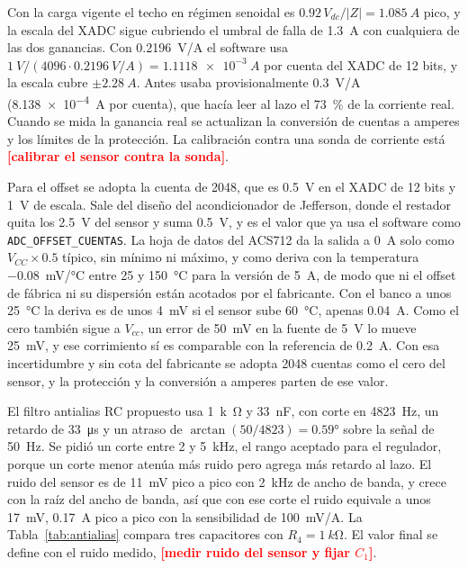 \documentclass[journal]{IEEEtran}
\newcommand{\pendiente}[1]{\textcolor{red}{\textbf{[#1]}}}
\begin{document}
Con la carga vigente el techo en régimen senoidal es $0.92\,V_{dc}/|Z|=\SI{1.085}{A}$ pico, y la escala del XADC sigue cubriendo el umbral de falla de \SI{1.3}{A} con cualquiera de las dos ganancias. Con \SI{0.2196}{V/A} el software usa $\SI{1}{V}/(4096\cdot\SI{0.2196}{V/A})=\SI{1.1118e-3}{A}$ por cuenta del XADC de \num{12} bits, y la escala cubre $\pm\SI{2.28}{A}$. Antes usaba provisionalmente \SI{0.3}{V/A} (\SI{8.138e-4}{A} por cuenta), que hacía leer al lazo el \SI{73}{\percent} de la corriente real. Cuando se mida la ganancia real se actualizan la conversión de cuentas a amperes y los límites de la protección. La calibración contra una sonda de corriente está \pendiente{calibrar el sensor contra la sonda}.

Para el offset se adopta la cuenta de \num{2048}, que es \SI{0.5}{V} en el XADC de \num{12} bits y \SI{1}{V} de escala. Sale del diseño del acondicionador de Jefferson, donde el restador quita los \SI{2.5}{V} del sensor y suma \SI{0.5}{V}, y es el valor que ya usa el software como \texttt{ADC\_OFFSET\_CUENTAS}. La hoja de datos del ACS712 \cite{acs712} da la salida a \SI{0}{A} solo como $V_{CC}\times0.5$ típico, sin mínimo ni máximo, y como deriva con la temperatura \SI{-0.08}{mV/\celsius} entre \SI{25}{} y \SI{150}{\celsius} para la versión de \SI{5}{A}, de modo que ni el offset de fábrica ni su dispersión están acotados por el fabricante. Con el banco a unos \SI{25}{\celsius} la deriva es de unos \SI{4}{mV} si el sensor sube \SI{60}{\celsius}, apenas \num{0.04}~A. Como el cero también sigue a $V_{cc}$, un error de \SI{50}{mV} en la fuente de \SI{5}{V} lo mueve \SI{25}{mV}, y ese corrimiento sí es comparable con la referencia de \SI{0.2}{A}. Con esa incertidumbre y sin cota del fabricante se adopta \num{2048} cuentas como el cero del sensor, y la protección y la conversión a amperes parten de ese valor.

El filtro antialias RC propuesto usa \SI{1}{k\ohm} y \SI{33}{nF}, con corte en \SI{4823}{Hz}, un retardo de \SI{33}{\micro s} y un atraso de $\arctan(50/4823)=\ang{0.59}$ sobre la señal de \SI{50}{Hz}. Se pidió un corte entre \num{2} y \SI{5}{kHz}, el rango aceptado para el regulador, porque un corte menor atenúa más ruido pero agrega más retardo al lazo. El ruido del sensor es de \SI{11}{mV} pico a pico con \SI{2}{kHz} de ancho de banda, y crece con la raíz del ancho de banda, así que con ese corte el ruido equivale a unos \SI{17}{mV}, \SI{0.17}{A} pico a pico con la sensibilidad de \SI{100}{mV/A}. La Tabla~\ref{tab:antialias} compara tres capacitores con $R_4=\SI{1}{k\ohm}$. El valor final se define con el ruido medido, \pendiente{medir ruido del sensor y fijar $C_1$}.
\end{document}
